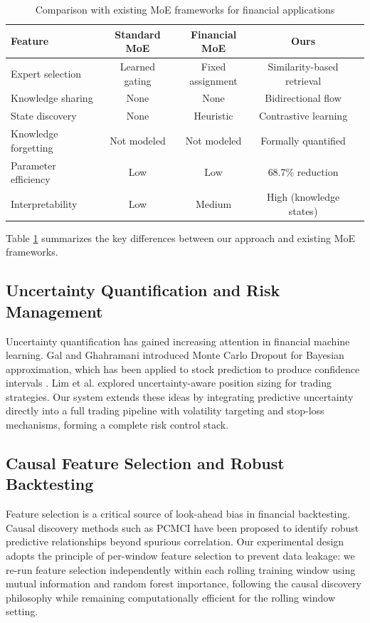 \documentclass[review]{elsarticle}
\begin{document}
\begin{table}[t]
\centering
\caption{Comparison with existing MoE frameworks for financial applications}
\label{tab:moe_comparison}
\begin{tabular}{lcccc}
\toprule
Feature & Standard MoE & Financial MoE & Ours \\
\midrule
Expert selection & Learned gating & Fixed assignment & Similarity-based retrieval \\
Knowledge sharing & None & None & Bidirectional flow \\
State discovery & None & Heuristic & Contrastive learning \\
Knowledge forgetting & Not modeled & Not modeled & Formally quantified \\
Parameter efficiency & Low & Low & 68.7\% reduction \\
Interpretability & Low & Medium & High (knowledge states) \\
\bottomrule
\end{tabular}
\end{table}

Table \ref{tab:moe_comparison} summarizes the key differences between our approach and existing MoE frameworks.

\subsection{Uncertainty Quantification and Risk Management}

Uncertainty quantification has gained increasing attention in financial machine learning. Gal and Ghahramani \citep{gal2016dropout} introduced Monte Carlo Dropout for Bayesian approximation, which has been applied to stock prediction to produce confidence intervals \citep{zhang2021uncertainty}. Lim et al. \citep{lim2019uncertainty} explored uncertainty-aware position sizing for trading strategies. Our system extends these ideas by integrating predictive uncertainty directly into a full trading pipeline with volatility targeting and stop-loss mechanisms, forming a complete risk control stack.

\subsection{Causal Feature Selection and Robust Backtesting}

Feature selection is a critical source of look-ahead bias in financial backtesting. Causal discovery methods such as PCMCI have been proposed to identify robust predictive relationships beyond spurious correlation. Our experimental design adopts the principle of per-window feature selection to prevent data leakage: we re-run feature selection independently within each rolling training window using mutual information and random forest importance, following the causal discovery philosophy while remaining computationally efficient for the rolling window setting.
\end{document}
